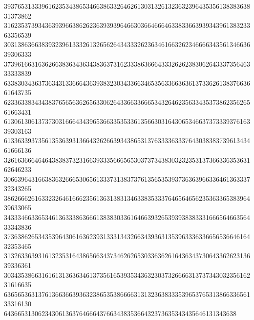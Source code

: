 39376531333961623534386534663863326462613031326132363239643535613838363831373862
31623537393436393966386262363939396466303664666463383366393934396138323363356539
30313863663839323961333261326562643433326236346166326234666634356134663639306333
37396166316362663836343634383637316233386366643332626238306264333735646333333839
63383034363736343133666436393832303433663465356336636361373362613837663661643735
62336338343438376565636265633062643366336665343264623563343537386235626561663431
61306130613737303166643439653663353533613566303164306534663737333937616339303163
61336339373561353639313664326266393438653137633336333764303838373961343461666136
32616366646464383837323166393335666565303737343830323235313736633635363162646233
30663964316638363266653065613337313837376135653539373636396633646136333732343265
38626662616332326461666235613631383134633835333764656465623536336538396439633065
34333466336534613633386366613838303361646639326539393838333166656466356433343836
37363862653435396430616362393133313432663439363135396333633665653664616432353465
31326336393161323531643865663437346262653033636261643634373064336262313639336361
30343538663161613136363461373561653935343632303732666631373734303235616231616635
63656536313761366366393632386535386666313132363833353965376531386633656133316130
64366531306234306136376466643766343835366432373635343435646131343638
